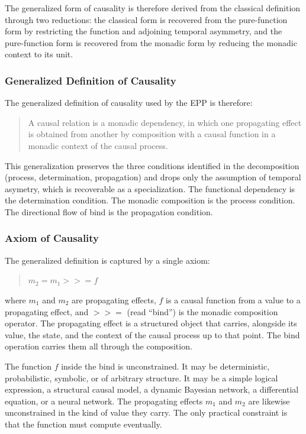 The generalized form of causality is therefore derived from the classical definition through two reductions: the classical form is recovered from the pure-function form by restricting the function and adjoining temporal asymmetry, and the pure-function form is recovered from the monadic form by reducing the monadic context to its unit.

  
\subsubsection{Generalized Definition of Causality}
\label{sub:epp_general_def_causality}

The generalized definition of causality used by the EPP is therefore:
 
\begin{quote}
    A causal relation is a monadic dependency, in which one propagating effect is obtained from another by composition with a causal function in a monadic context of the causal process.
\end{quote}
 
This generalization preserves the three conditions identified in the decomposition (process, determination, propagation) and drops only the assumption of temporal asymetry, which is recoverable as a specialization. The functional dependency is the determination condition. The monadic composition is the process condition. The directional flow of bind is the propagation condition.

\subsubsection{Axiom of Causality}
\label{sub:epp_axiom_causality}


The generalized definition is captured by a single axiom:
 
\begin{quotation}
	\textbf{$m_{2} = m_{1} \mathbin{>\!\!>\!\!=} f$}
\end{quotation}
    
\noindent where $m_1$ and $m_2$ are propagating effects, $f$ is a causal function from a value to a propagating effect, and $\mathbin{>\!\!>\!\!=}$ (read ``bind'') is the monadic composition operator. The propagating effect is a structured object that carries, alongside its value, the state, and the context of the causal process up to that point. The bind operation carries them all through the composition.    
    
The function $f$ inside the bind is unconstrained. It may be deterministic, probabilistic, symbolic, or of arbitrary structure. It may be a simple logical expression, a structural causal model, a dynamic Bayesian network, a differential equation, or a neural network. The propagating effects $m_1$ and $m_2$ are likewise unconstrained in the kind of value they carry. The only practical constraint is that the function must compute eventually.  
   
